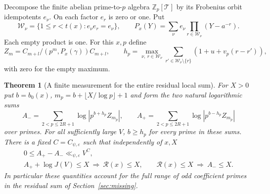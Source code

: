 \documentclass[a4paper,11pt]{article}
\newtheorem{theorem}[proposition]{Theorem}
\theoremstyle{definition}
\theoremstyle{remark}
\newcommand{\ZZ}{\mathbb Z}\newcommand{\ord}{\operatorname{ord}}
\numberwithin{equation}{section}
\begin{document}
Decompose the finite abelian prime-to-\(p\) algebra
\(\ZZ_p[\mathcal T]\) by its Frobenius orbit idempotents
\(e_\nu\). On each factor \(e_r\) is zero or one. Put
\[
 \mathcal W_\nu=\{1\le r<t(x):e_\nu e_r=e_\nu\},\qquad
 P_x(Y)=\sum_\nu e_\nu\prod_{r\in\mathcal W_\nu}(Y-a^{-r}).
\]
Each empty product is one. For this \(x,p\) define
\[
 Z_m=C_{m+l}/(p^m,P_x(\gamma))C_{m+l},\qquad
 h_p=\max_{\nu,\ r\in\mathcal W_\nu}
       \sum_{r'\in\mathcal W_\nu\setminus\{r\}}
                        (1+u+v_p(r-r')) ,
\]
with zero for the empty maximum.

\begin{theorem}[A finite measurement for the entire residual local sum]
\leavevmode\label{thm:totalresidual649}
For \(X>0\) put \(b=b_0(x)\), \(m_p=b+\lfloor X/\log p\rfloor+1\)
and form the two natural logarithmic sums
\[
 A_-=\sum_{2<p\le2R+1}\log|p^{b+h_p}Z_{m_p}|,\qquad
 A_+=\sum_{2<p\le2R+1}\log|p^{b-h_p}Z_{m_p}|
\]
over primes. For all sufficiently large \(V\), \(b\ge h_p\)
for every prime in these sums. There is a fixed
\(C=C_{\psi,\varepsilon}\) such that independently of \(x,X\)
\[
 \begin{gathered}
        0\le A_+-A_-\ll_{\psi,\varepsilon} V^C,\\
 A_++\log J(V)\le X\ \Longrightarrow\ \mathcal R(x)\le X,
 \qquad
 \mathcal R(x)\le X\ \Longrightarrow\ A_-\le X .
\end{gathered}
\]
In particular these quantities account for the full range of
odd coefficient primes in the residual sum of Section~\ref{sec:missing}.
\end{theorem}
\end{document}
